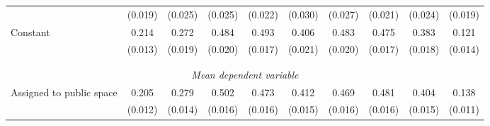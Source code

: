 \begin{tabular}{l*{9}{c}}
                    &     (0.019)         &     (0.025)         &     (0.025)         &     (0.022)         &     (0.030)         &     (0.027)         &     (0.021)         &     (0.024)         &     (0.019)         \\
[1em]
Constant            &       0.214\sym{***}&       0.272\sym{***}&       0.484\sym{***}&       0.493\sym{***}&       0.406\sym{***}&       0.483\sym{***}&       0.475\sym{***}&       0.383\sym{***}&       0.121\sym{***}\\
                    &     (0.013)         &     (0.019)         &     (0.020)         &     (0.017)         &     (0.021)         &     (0.020)         &     (0.017)         &     (0.018)         &     (0.014)         \\
\\[-1.8ex] \hline \\[-1.8ex]  
\multicolumn{10}{c}{\textit{Mean dependent variable}} \\ Assigned to public space&       0.205         &       0.279         &       0.502         &       0.473         &       0.412         &       0.469         &       0.481         &       0.404         &       0.138         \\
\,                  &     (0.012)         &     (0.014)         &     (0.016)         &     (0.016)         &     (0.015)         &     (0.016)         &     (0.016)         &     (0.015)         &     (0.011)         \\


\end{tabular}
